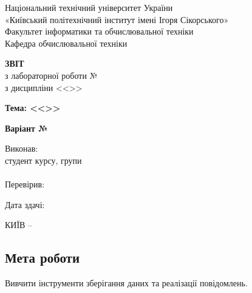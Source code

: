 \documentclass[14pt, a4paper]{extreport}
\begin{document}
	
	\begin{titlepage}
		\begin{center}
			\normalsize
			Національний технічний університет України\\
			«Київський політехнічний інститут імені Ігоря Сікорського» \\[0.5em]
			Факультет інформатики та обчислювальної техніки\\
			Кафедра обчислювальної техніки
			
			\vfill
			
			{\large \textbf{ЗВІТ}\\[0.5em]}
			{з лабораторної роботи №\LabNumber \\}
			{з дисципліни <<\CourseTitle>>}
			
			\vspace{2em}
			
			{\textbf{Тема: <<\Topic>>}}
			
			\vspace{1em}
			
			{\textbf{Варіант №\Variant}}
			
			\vfill
			
			\begin{flushright}
				Виконав: \\ студент \CourseNumber{} курсу, групи \StudentGroup \\
				\StudentName \\[1em]
				Перевірив: \\ \Teacher
			\end{flushright}
			
			\vfill
			
			\begin{flushright}
				Дата здачі: \DTMtoday
			\end{flushright}
			
			\vspace{5em}
			КИЇВ -- \ReportYear
		\end{center}
	\end{titlepage}
	
	\clearpage
	\setcounter{page}{2}
	
	\subsection*{Мета роботи} 
	
	Вивчити інструменти зберігання даних та реалізації повідомлень.
	
\end{document}
